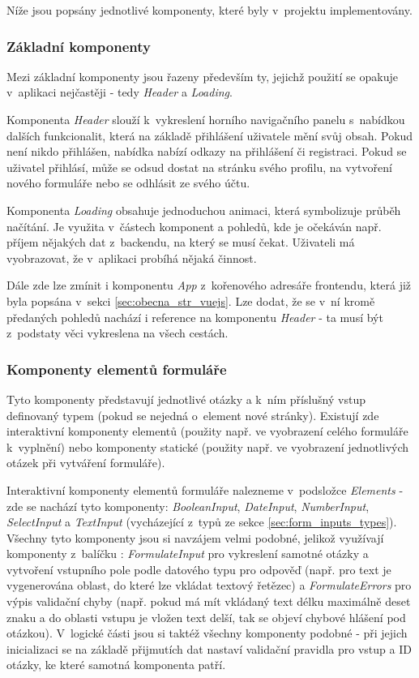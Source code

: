 	Níže jsou popsány jednotlivé komponenty, které byly v~projektu implementovány.
		
		\subsubsection{Základní komponenty} \label{sec:komp_zakl} %
		Mezi základní komponenty jsou řazeny především ty, jejichž použití se opakuje v~aplikaci nejčastěji - tedy \textit{Header} a \textit{Loading}. 
		
		Komponenta \textit{Header} slouží k~vykreslení horního navigačního panelu s~nabídkou dalších funkcionalit, která na základě přihlášení uživatele mění svůj obsah. Pokud není nikdo přihlášen, nabídka nabízí odkazy na přihlášení či registraci. Pokud se uživatel přihlásí, může se odsud dostat na stránku svého profilu, na vytvoření nového formuláře nebo se odhlásit ze svého účtu.
		
		Komponenta \textit{Loading} obsahuje jednoduchou animaci, která symbolizuje průběh načítání. Je využita v~částech komponent a pohledů, kde je očekáván např. příjem nějakých dat z~backendu, na který se musí čekat. Uživateli má vyobrazovat, že v~aplikaci probíhá nějaká činnost.
		
		Dále zde lze zmínit i komponentu \textit{App} z~kořenového adresáře frontendu, která již byla popsána v~sekci \ref{sec:obecna_str_vuejs}. Lze dodat, že se v~ní kromě předaných pohledů nachází i reference na komponentu \textit{Header} - ta musí být z~podstaty věci vykreslena na všech cestách.
		
		\subsubsection{Komponenty elementů formuláře} \label{sec:komp_form} %
		Tyto komponenty představují jednotlivé otázky a k~ním příslušný vstup definovaný typem (pokud se nejedná o~element nové stránky). Existují zde interaktivní komponenty elementů (použity např. ve vyobrazení celého formuláře k~vyplnění) nebo komponenty statické (použity např. ve vyobrazení jednotlivých otázek při vytváření formuláře).
		
		Interaktivní komponenty elementů formuláře nalezneme v~podsložce \textit{Elements} - zde se nachází tyto komponenty: \textit{BooleanInput}, \textit{DateInput}, \textit{NumberInput}, \textit{SelectInput} a \textit{TextInput} (vycházející z~typů ze sekce \ref{sec:form_inputs_types}). Všechny tyto komponenty jsou si navzájem velmi podobné, jelikož využívají komponenty z~balíčku : \textit{FormulateInput} pro vykreslení samotné otázky a vytvoření vstupního pole podle datového typu pro odpověď (např. pro text je vygenerována oblast, do které lze vkládat textový řetězec) a \textit{FormulateErrors} pro výpis validační chyby (např. pokud má mít vkládaný text délku maximálně deset znaku a do oblasti vstupu je vložen text delší, tak se objeví chybové hlášení pod otázkou). V~logické části jsou si taktéž všechny komponenty podobné - při jejich inicializaci se na základě přijmutích dat nastaví validační pravidla pro vstup a ID otázky, ke které samotná komponenta patří.
		
